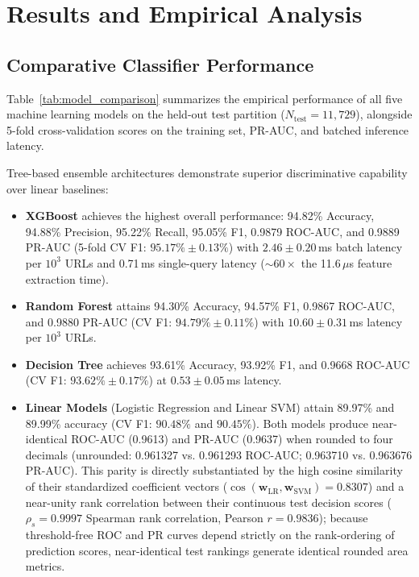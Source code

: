 \section{Results and Empirical Analysis}
\label{sec:results}

\subsection{Comparative Classifier Performance}
Table~\ref{tab:model_comparison} summarizes the empirical performance of all five machine learning models on the held-out test partition ($N_{\text{test}} = 11,729$), alongside 5-fold cross-validation scores on the training set, PR-AUC, and batched inference latency.



Tree-based ensemble architectures demonstrate superior discriminative capability over linear baselines:
\begin{itemize}
    \item \textbf{XGBoost} achieves the highest overall performance: 94.82\% Accuracy, 94.88\% Precision, 95.22\% Recall, 95.05\% F1, 0.9879 ROC-AUC, and 0.9889 PR-AUC (5-fold CV F1: $95.17\% \pm 0.13\%$) with $2.46 \pm 0.20$\,ms batch latency per $10^3$ URLs and 0.71\,ms single-query latency ($\sim 60\times$ the 11.6\,$\mu$s feature extraction time).
    \item \textbf{Random Forest} attains 94.30\% Accuracy, 94.57\% F1, 0.9867 ROC-AUC, and 0.9880 PR-AUC (CV F1: $94.79\% \pm 0.11\%$) with $10.60 \pm 0.31$\,ms latency per $10^3$ URLs.
    \item \textbf{Decision Tree} achieves 93.61\% Accuracy, 93.92\% F1, and 0.9668 ROC-AUC (CV F1: $93.62\% \pm 0.17\%$) at $0.53 \pm 0.05$\,ms latency.
    \item \textbf{Linear Models} (Logistic Regression and Linear SVM) attain 89.97\% and 89.99\% accuracy (CV F1: $90.48\%$ and $90.45\%$). Both models produce near-identical ROC-AUC (0.9613) and PR-AUC (0.9637) when rounded to four decimals (unrounded: 0.961327 vs. 0.961293 ROC-AUC; 0.963710 vs. 0.963676 PR-AUC). This parity is directly substantiated by the high cosine similarity of their standardized coefficient vectors ($\cos(\mathbf{w}_{\text{LR}}, \mathbf{w}_{\text{SVM}}) = 0.8307$) and a near-unity rank correlation between their continuous test decision scores ($\rho_s = 0.9997$ Spearman rank correlation, Pearson $r = 0.9836$); because threshold-free ROC and PR curves depend strictly on the rank-ordering of prediction scores, near-identical test rankings generate identical rounded area metrics.
\end{itemize}


